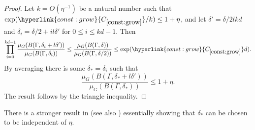 \documentclass[12pt,reqno]{amsart}
\numberwithin{equation}{section}
\newcommand{\refconstbig}[1]{%
    \hyperlink{const:#1}{C_{\ref{const:#1}}}%
}
\begin{document}
\begin{proof}
Let $k=O(\eta^{-1})$ be a natural number such that $\exp(\refconstbig{grow}/k) \leq 1+\eta$, and let $\delta'=\delta/2lkd$ and $\delta_i=\delta/2+il\delta'$ for $0 \leq i \leq kd-1$. Then 
\begin{equation*}
\prod_{i=0}^{kd-1}{\frac{\mu_G(B(\Gamma,\delta_i+l\delta'))}{\mu_G(B(\Gamma,\delta_i))}} \leq \frac{\mu_G(B(\Gamma,\delta))}{\mu_G(B(\Gamma,\delta/2))} \leq \exp(\refconstbig{grow}d).
\end{equation*}
By averaging there is some $\delta_*=\delta_i$ such that 
\begin{equation*}
\frac{\mu_G(B(\Gamma,\delta_*+l\delta'))}{\mu_G(B(\Gamma,\delta_*))} \leq 1+\eta.
\end{equation*}
The result follows by the triangle inequality.
\end{proof}
There is a stronger result in \cite[Lemma 4.24, p192]{taovu::} (see also \cite[\S3]{bou::5}) essentially showing that $\delta_*$ can be chosen to be independent of $\eta$. 
\end{document}
